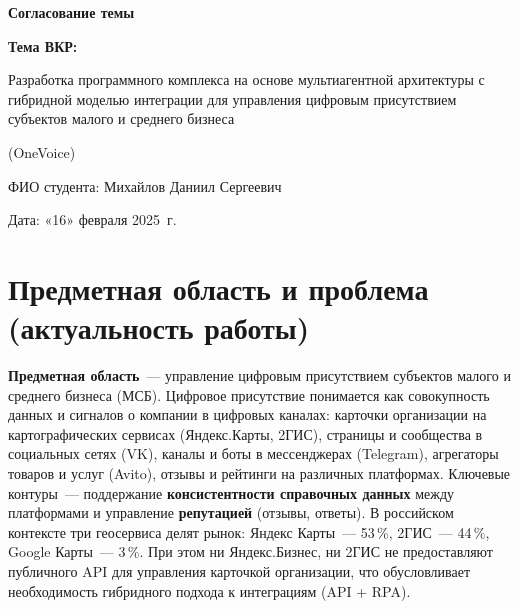 \documentclass[12pt]{G7-32}
\begin{document}
\thispagestyle{empty}
\begin{center}
  \vspace*{2cm}
  {\fontsize{16pt}{24pt}\selectfont\bfseries
    Согласование темы}

  \vspace{2cm}
  {\fontsize{14pt}{21pt}\selectfont\bfseries
    Тема ВКР:}

  \vspace{0.8cm}
  {\fontsize{12pt}{18pt}\selectfont
    Разработка программного комплекса на основе мультиагентной архитектуры с гибридной моделью интеграции для управления цифровым присутствием субъектов малого и среднего бизнеса}

  \vspace{0.3cm}
  {\fontsize{11pt}{16pt}\selectfont
    (OneVoice)}

  \vspace{2cm}
  {\fontsize{14pt}{21pt}\selectfont
    ФИО студента: Михайлов Даниил Сергеевич}

  \vspace{1.5cm}
  {\fontsize{12pt}{18pt}\selectfont
    Дата: «16» февраля 2025~г.}
\end{center}
\clearpage

\mainmatter

\chapter{Предметная область и проблема (актуальность работы)}
\label{ch:subject}

\textbf{Предметная область}~--- управление цифровым присутствием субъектов малого и среднего бизнеса (МСБ). Цифровое присутствие понимается как совокупность данных и сигналов о компании в цифровых каналах: карточки организации на картографических сервисах (Яндекс.Карты, 2ГИС), страницы и сообщества в социальных сетях (VK), каналы и боты в мессенджерах (Telegram), агрегаторы товаров и услуг (Avito), отзывы и рейтинги на различных платформах. Ключевые контуры~--- поддержание \textbf{консистентности справочных данных} между платформами и управление \textbf{репутацией} (отзывы, ответы). В российском контексте три геосервиса делят рынок: Яндекс Карты~--- 53\,\%, 2ГИС~--- 44\,\%, Google Карты~--- 3\,\%. При этом ни Яндекс.Бизнес, ни 2ГИС не предоставляют публичного API для управления карточкой организации, что обусловливает необходимость гибридного подхода к интеграциям (API + RPA).
\end{document}
